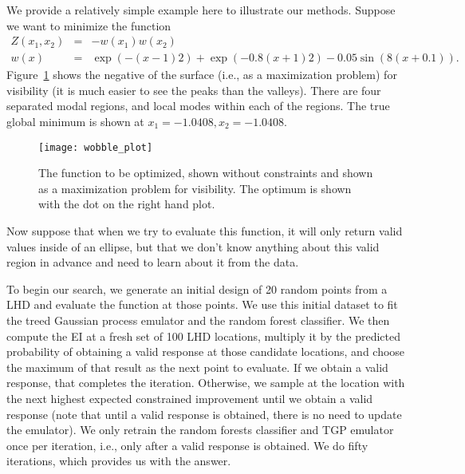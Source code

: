 \documentclass[12pt]{article}
\begin{document}
We provide a relatively simple example here to illustrate our
methods.  Suppose we want to minimize the function
\begin{eqnarray}
Z(x_1,x_2) & = & -w(x_1)w(x_2) \\
w(x) & = & \exp\left(-(x-1)2\right) + \exp\left(-0.8(x+1)2\right) 
- 0.05\sin\left(8(x+0.1)\right).
\end{eqnarray}
Figure~\ref{fig:ex1.uncon} shows the negative of the surface (i.e., as
a maximization problem) for visibility (it is much easier to see the
peaks than the valleys).  There are four separated modal regions, and
local modes within each of the regions.  The true global minimum is
shown at $x_1=-1.0408, x_2=-1.0408$.
\begin{figure}[ht!]
\begin{center}
\texttt{[image: wobble\_plot]}
\end{center}
\caption{The function to be optimized, shown without constraints and
  shown as a maximization problem for visibility.  The optimum is
  shown with the dot on the right hand plot.}
\label{fig:ex1.uncon}
\end{figure}
Now suppose that when we try to evaluate this function, it will only
return valid values inside of an ellipse, but that we don't know
anything about this valid region in advance and need to learn about it
from the data.

To begin our search, we generate an initial design of 20 random points
from a LHD and evaluate the function at those points.  We use this
initial dataset to fit the treed Gaussian process emulator and the
random forest classifier.  We then compute the EI at a fresh set of
100 LHD locations, multiply it by the predicted probability of
obtaining a valid response at those candidate locations, and choose
the maximum of that result as the next point to evaluate.  If we
obtain a valid response, that completes the iteration. Otherwise, we
sample at the location with the next highest expected constrained
improvement until we obtain a valid response (note that until a valid
response is obtained, there is no need to update the emulator).  We
only retrain the random forests classifier and TGP emulator 
once per iteration, i.e., only after a valid response is obtained.  We
do fifty iterations, which provides us with the answer.
\end{document}
